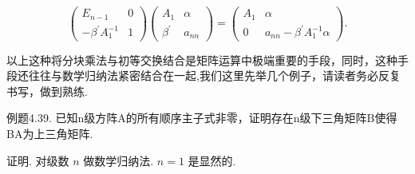 \documentclass{article}
\begin{document}
\begin{equation*}
    \left(\begin{array}{cc}
        E_{n-1}                    & 0 \\
        -\beta^{\prime} A_{1}^{-1} & 1
    \end{array}\right)\left(\begin{array}{cc}
        A_{1}          & \alpha  \\
        \beta^{\prime} & a_{n n}
    \end{array}\right)=\left(\begin{array}{cc}
        A_{1} & \alpha                                   \\
        0     & a_{n n}-\beta^{\prime} A_{1}^{-1} \alpha
    \end{array}\right).
\end{equation*}

以上这种将分块乘法与初等交换结合是矩阵运算中{\heiti 极端重要}的手段，同时，这种手段还往往与数学归纳法紧密结合在一起,我们这里先举几个例子，请读者{\heiti 务必反复书写}，做到{\heiti 熟练}.

\vspace{1ex}
{\heiti 例题4.39.} {\kaishu 已知n级方阵A的所有顺序主子式非零，证明存在n级下三角矩阵B使得BA为上三角矩阵.}

{\heiti 证明.} 对级数 $n$ 做数学归纳法. $n=1$ 是显然的.
\end{document}
